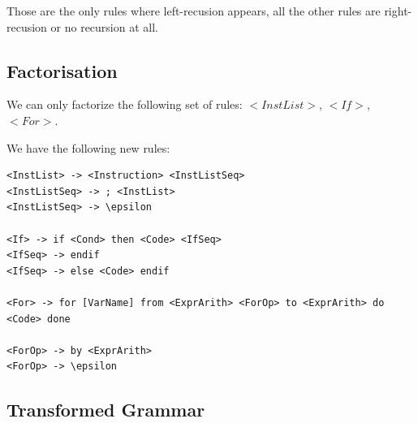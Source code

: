 \documentclass[letterpaper]{article}
\begin{document}
Those are the only rules where left-recusion appears, all the other rules
are right-recusion or no recursion at all.

\subsection{Factorisation}

We can only factorize the following set of rules: $<InstList>$, $<If>$, $<For>$.

We have the following new rules:

\begin{lstlisting}
<InstList> -> <Instruction> <InstListSeq>
<InstListSeq> -> ; <InstList>
<InstListSeq> -> \epsilon

<If> -> if <Cond> then <Code> <IfSeq>
<IfSeq> -> endif
<IfSeq> -> else <Code> endif

<For> -> for [VarName] from <ExprArith> <ForOp> to <ExprArith> do <Code> done

<ForOp> -> by <ExprArith>
<ForOp> -> \epsilon

\end{lstlisting}

\subsection{Transformed Grammar}
\end{document}
